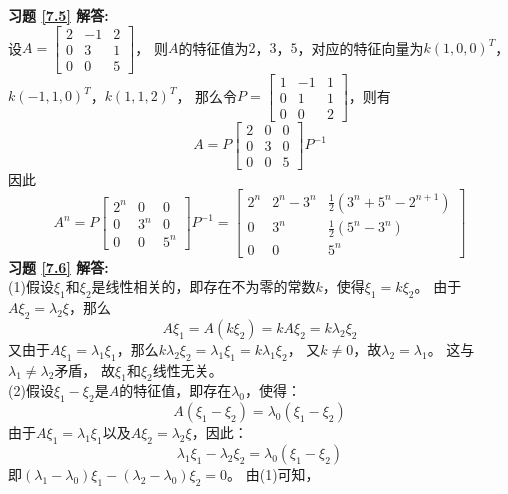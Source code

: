 \textbf{习题 \ref{7.5} 解答:}\\
设$A=\begin{bmatrix}2&-1&2\\0&3&1\\0&0&5\end{bmatrix}$，
则$A$的特征值为$2$，$3$，$5$，对应的特征向量为$k(1,0,0)^T$，
$k(-1,1,0)^T$，$k(1,1,2)^T$，
那么令$P=\begin{bmatrix}1&-1&1\\0&1&1\\0&0&2\end{bmatrix}$，则有
\begin{equation*}
A=P\begin{bmatrix}2&0&0\\0&3&0\\0&0&5\end{bmatrix}P^{-1}
\end{equation*}
因此
\begin{equation*}
A^{n}=P\begin{bmatrix}2^{n}&0&0\\0&3^{n}&0\\0&0&5^{n}\end{bmatrix}P^{-1}
=\begin{bmatrix}2^{n}&2^n-3^n&\frac{1}{2}(3^n+5^n-2^{n+1})\\0&3^n&\frac{1}{2}(5^n-3^n)\\0&0&5^n\end{bmatrix}
\end{equation*}
\textbf{习题 \ref{7.6} 解答:}\\
(1)假设$\xi_1$和$\xi_2$是线性相关的，即存在不为零的常数$k$，使得$\xi_1=k\xi_2$。
由于$A\xi_2=\lambda_2\xi$，那么
\begin{equation*}
  A\xi_1=A(k\xi_2)=kA\xi_2=k\lambda_2\xi_2
\end{equation*}
又由于$A\xi_1=\lambda_1\xi_1$，那么$k\lambda_2\xi_2=\lambda_1\xi_1=k\lambda_1\xi_2$，
又$k\neq0$，故$\lambda_2=\lambda_1$。 这与$\lambda_1\neq\lambda_2$矛盾，
故$\xi_1$和$\xi_2$线性无关。\\
(2)假设$\xi_1-\xi_2$是$A$的特征值，即存在$\lambda_0$，使得：
\begin{equation*}
  A(\xi_1-\xi_2)=\lambda_0(\xi_1-\xi_2)
\end{equation*}
由于$A\xi_1=\lambda_1\xi_1$以及$A\xi_2=\lambda_2\xi$，因此：
\begin{equation*}
  \lambda_1\xi_1-\lambda_2\xi_2=\lambda_0(\xi_1-\xi_2)
\end{equation*}
即$(\lambda_1-\lambda_0)\xi_1-(\lambda_2-\lambda_0)\xi_2=0$。 由(1)可知，
